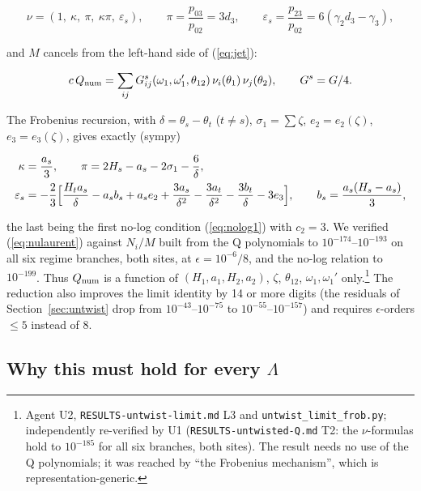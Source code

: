\documentclass[11pt]{article}
\begin{document}
\begin{equation}
\nu=(1,\ \kappa,\ \pi,\ \kappa\pi,\ \varepsilon_s),\qquad \pi=\frac{p_{03}}{p_{02}}=3d_3,\qquad \varepsilon_s=\frac{p_{23}}{p_{02}}=6(\gamma_2d_3-\gamma_3),\label{eq:nu}
\end{equation}

and $M$ cancels from the left-hand side of (\ref{eq:jet}):

\begin{equation}
c\,Q_{\rm num}=\sum_{ij}G^s_{ij}(\omega_1,\omega_1',\theta_{12})\,\nu_i(\theta_1)\,\nu_j(\theta_2),\qquad G^s=G/4.\label{eq:nuform}
\end{equation}

The Frobenius recursion, with $\delta=\theta_s-\theta_t$ ($t\ne s$), $\sigma_1=\sum\zeta$, $e_2=e_2(\zeta)$, $e_3=e_3(\zeta)$, gives exactly (sympy)

\begin{equation}
\begin{aligned}
\kappa&=\frac{a_s}3,\qquad \pi=2H_s-a_s-2\sigma_1-\frac6\delta,\\
\varepsilon_s&=-\frac23\Bigl[\frac{H_ta_s}\delta-a_sb_s+a_se_2+\frac{3a_s}{\delta^2}-\frac{3a_t}{\delta^2}-\frac{3b_t}\delta-3e_3\Bigr],\qquad b_s=\frac{a_s(H_s-a_s)}3,
\end{aligned}\label{eq:nulaurent}
\end{equation}

the last being the first no-log condition (\ref{eq:nolog1}) with $c_2=3$. We verified (\ref{eq:nulaurent}) against $N_i/M$ built from the Q polynomials to $10^{-174}$--$10^{-193}$ on all six regime branches, both sites, at $\epsilon=10^{-6}/8$, and the no-log relation to $10^{-199}$. Thus $Q_{\rm num}$ is a function of $(H_1,a_1,H_2,a_2)$, $\zeta$, $\theta_{12}$, $\omega_1,\omega_1'$ only.\footnote{Agent U2, \texttt{RESULTS-\allowbreak{}untwist-\allowbreak{}limit.\allowbreak{}md} L3 and \texttt{untwist\_\allowbreak{}limit\_\allowbreak{}frob.\allowbreak{}py}; independently re-verified by U1 (\texttt{RESULTS-\allowbreak{}untwisted-\allowbreak{}Q.\allowbreak{}md} T2: the $\nu$-formulas hold to $10^{-185}$ for all six branches, both sites).
The result needs no use of the Q polynomials; it was reached by ``the Frobenius mechanism'', which is representation-generic.} The reduction also improves the limit identity by 14 or more digits (the residuals of Section~\ref{sec:untwist} drop from $10^{-43}$--$10^{-75}$ to $10^{-55}$--$10^{-157}$) and requires $\epsilon$-orders $\le5$ instead of $8$.

\subsection{Why this must hold for every \texorpdfstring{$\Lambda$}{}}\label{sec:nugen}
\end{document}
